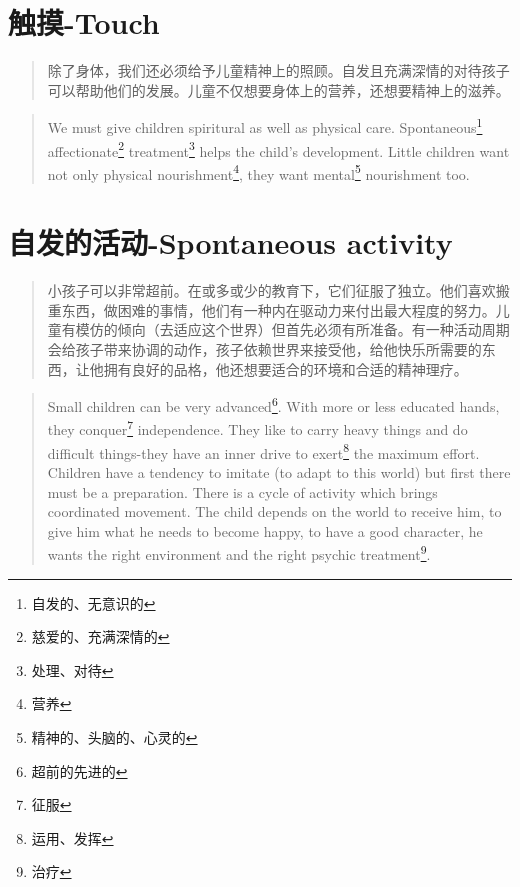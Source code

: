 \documentclass[lang=cn,10pt]{elegantbook}
\begin{document}
\chapter{触摸-Touch}

\begin{quote}
{\small 除了身体，我们还必须给予儿童精神上的照顾。自发且充满深情的对待孩子可以帮助他们的发展。儿童不仅想要身体上的营养，还想要精神上的滋养。}
\end{quote}

\begin{tcolorbox}
\begin{quote}
{\small We must give children spiritural as well as physical care. Spontaneous\footnote{自发的、无意识的} affectionate\footnote{慈爱的、充满深情的} treatment\footnote{处理、对待} helps the child's development. Little children want not only physical nourishment\footnote{营养}, they want mental\footnote{精神的、头脑的、心灵的} nourishment too.}
\end{quote}
\end{tcolorbox}


\chapter{自发的活动-Spontaneous activity}

\begin{quote}
{\small 小孩子可以非常超前。在或多或少的教育下，它们征服了独立。他们喜欢搬重东西，做困难的事情，他们有一种内在驱动力来付出最大程度的努力。儿童有模仿的倾向（去适应这个世界）但首先必须有所准备。有一种活动周期会给孩子带来协调的动作，孩子依赖世界来接受他，给他快乐所需要的东西，让他拥有良好的品格，他还想要适合的环境和合适的精神理疗。}
\end{quote}

\begin{tcolorbox}
\begin{quote}
{\small Small children can be very advanced\footnote{超前的先进的}. With more or less educated hands, they conquer\footnote{征服} independence. They like to carry heavy things and do difficult things-they have an inner drive to exert\footnote{运用、发挥} the maximum effort. Children have a tendency to imitate (to adapt to this world) but first there must be a preparation. There is a cycle of activity which brings coordinated movement. The child depends on the world to receive him, to give him what he needs to become happy, to have a good character, he wants the right environment and the right psychic treatment\footnote{治疗}.}
\end{quote}
\end{tcolorbox}
\end{document}

